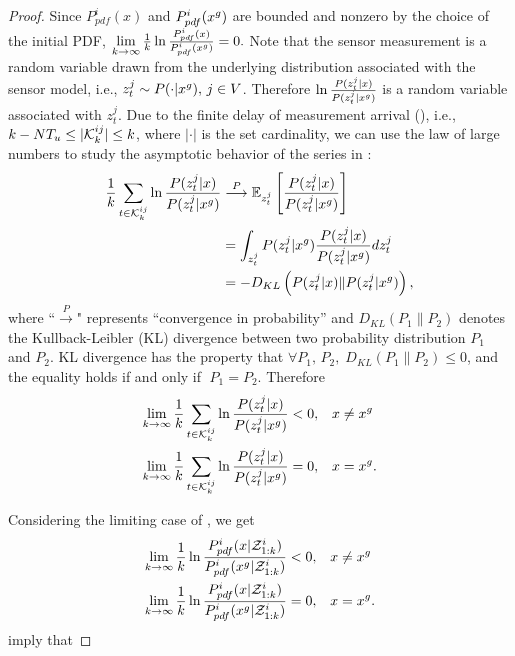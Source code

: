 \begin{proof}
		Since $P^i_{pdf}(x)$ and $P^i_{pdf}(x^g)$ are bounded and nonzero by the choice of the initial PDF, $\lim\limits_{k\rightarrow \infty}\frac{1}{k}\ln\frac{P^i_{pdf}(x)}{P^i_{pdf}(x^g)}= 0.$
		\textcolor{\revcol}{Note that the sensor measurement is a random variable drawn from the underlying distribution associated with the sensor model, i.e., $z^j_t\sim P(\cdot|x^g),\,j\in V$.
		Therefore $\ln\frac{P(z^j_t|x)}{P(z^j_t|x^g)}$ is a random variable associated with $z^j_t$.
		Due to the finite delay of measurement arrival (), i.e., 
		$k-NT_u\leq |\mathcal{K}^{ij}_{k}|\leq k$, where $|\cdot|$ is the set cardinality, we can use the law of large numbers to study the asymptotic behavior of the series in :}
		\small\begin{subequations}\label{eqn:cmp_lim2}
			\begin{align}
			\frac{1}{k}\sum\limits_{t\in\mathcal{K}^{ij}_{k}}\ln\frac{P(z^j_t|x)}{P(z^j_t|x^g)}&\overset{P}{\longrightarrow}\mathbb{E}_{z^j_t} \left[\frac{P(z^j_t|x)}{P(z^j_t|x^g)}\right]\\
			&=\int_{z^j_t} P(z^j_t|x^g)\frac{P(z^j_t|x)}{P(z^j_t|x^g)} dz^j_t\\
			&=-D_{KL}\left(P(z^j_t|x)\|P(z^j_t|x^g)\right),
			\end{align}
		\end{subequations}\normalsize		
		where ``$\overset{P}{\longrightarrow}$" represents ``convergence in probability'' and $D_{KL}(P_1\|P_2)$ denotes the Kullback-Leibler (KL) divergence between two probability distribution $P_1$ and $P_2$.
		KL divergence has the property that $\forall P_1,\,P_2, \; D_{KL}(P_1\|P_2)\leq 0$, and the equality holds if and only if $\; P_1=P_2.$ Therefore
		\small\begin{align*}
		\lim\limits_{k\rightarrow \infty}\frac{1}{k}\sum\limits_{t\in\mathcal{K}^{ij}_{k}}\ln\frac{P(z^j_t|x)}{P(z^j_t|x^g)}<0,&\quad x\neq x^g\\
		\lim\limits_{k\rightarrow \infty}\frac{1}{k}\sum\limits_{t\in\mathcal{K}^{ij}_{k}}\ln\frac{P(z^j_t|x)}{P(z^j_t|x^g)}=0,&\quad x= x^g.
		\end{align*}\normalsize
		
		Considering the limiting case of , we get
		\small\begin{align}
		\lim\limits_{k\rightarrow \infty}\frac{1}{k}\ln\frac{P^i_{pdf}(x|\mathcal{Z}^i_{1:k})}{P^i_{pdf}(x^g|\mathcal{Z}^i_{1:k})}<0,&\quad x\neq x^g\label{subeqn:limit1}\\
		\lim\limits_{k\rightarrow \infty}\frac{1}{k}\ln\frac{P^i_{pdf}(x|\mathcal{Z}^i_{1:k})}{P^i_{pdf}(x^g|\mathcal{Z}^i_{1:k})}=0,&\quad x= x^g\label{subeqn:limit2}.
		\end{align}\normalsize
		 imply that
		

\end{proof}
